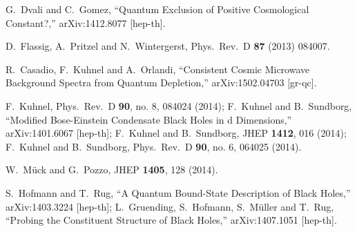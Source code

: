 \documentclass[aps, prd, preprint, superscriptaddress, tightenlines, nofootinbib]{revtex4}
\begin{document}
\begin{thebibliography}{99}
	G.~Dvali and C.~Gomez,
	``Quantum Exclusion of Positive Cosmological Constant?,''
	arXiv:1412.8077 [hep-th].

	D.~Flassig, A.~Pritzel and N.~Wintergerst,
	Phys.~Rev.~D {\bf 87} (2013) 084007.

	R.~Casadio, F.~Kuhnel and A.~Orlandi,
	``Consistent Cosmic Microwave Background Spectra from Quantum Depletion,''
	arXiv:1502.04703 [gr-qc].

	F.~Kuhnel,
	Phys.~Rev.~D {\bf 90}, no. 8, 084024 (2014);
	F.~Kuhnel and B.~Sundborg,
	``Modified Bose-Einstein Condensate Black Holes in d Dimensions,''
	arXiv:1401.6067 [hep-th];
	F.~Kuhnel and B.~Sundborg,
	JHEP {\bf 1412}, 016 (2014);
	F.~Kuhnel and B.~Sundborg,
	Phys.~Rev.~D {\bf 90}, no. 6, 064025 (2014).

	W.~M{\"u}ck and G.~Pozzo,
	JHEP {\bf 1405}, 128 (2014).

	S.~Hofmann and T.~Rug,
	``A Quantum Bound-State Description of Black Holes,''
	arXiv:1403.3224 [hep-th];
	L.~Gruending, S.~Hofmann, S.~M{\"u}ller and T.~Rug,
	``Probing the Constituent Structure of Black Holes,''
	arXiv:1407.1051 [hep-th].
  

\end{thebibliography}
\end{document}
